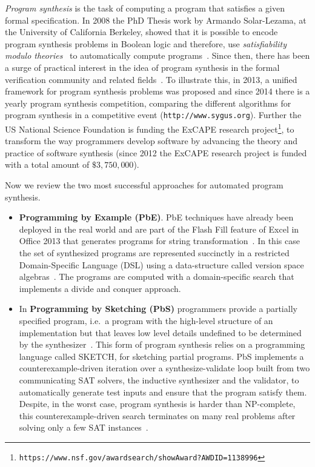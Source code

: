 \documentclass[10pt,a4paper]{paper}
\begin{document}
{\em Program synthesis} is the task of computing a program that satisfies a given formal specification. In 2008 the PhD Thesis work by Armando Solar-Lezama, at the University of California Berkeley, showed that it is possible to encode program synthesis problems in Boolean logic and therefore, use {\em satisfiability modulo theories}~\cite{barrett:SMT:2009} to automatically compute programs~\cite{lezama2008program}. Since then, there has been a surge of practical interest in the idea of program synthesis in the formal verification community and related fields~\cite{alur2013syntax}. To illustrate this, in 2013, a unified framework for program synthesis problems was proposed and since 2014 there is a yearly program synthesis competition, comparing the different algorithms for program synthesis in a competitive event ({\tt http://www.sygus.org}). Further the US National Science Foundation is funding the ExCAPE research project\footnote{\tt https://www.nsf.gov/awardsearch/showAward?AWD\textunderscore ID=1138996}, to transform the way programmers develop software by advancing the theory and practice of software synthesis (since 2012 the ExCAPE research project is funded with a total amount of $\$3,750,000$).

Now we review the two most successful approaches for automated program synthesis. 
\begin{itemize}
\item{\bf Programming by Example (PbE)}. PbE techniques have already been deployed in the real world and are part of the {\sc Flash Fill} feature of Excel in Office 2013 that generates programs for string transformation~\cite{gulwani2011automating}. In this case the set of synthesized programs are represented succinctly in a restricted Domain-Specific Language (DSL) using a data-structure called version space algebras~\cite{mitchell1982generalization}. The programs are computed with a domain-specific search that implements a divide and conquer approach. 

\item In {\bf Programming by Sketching (PbS)} programmers provide a partially specified program, i.e.~a program with the high-level structure of an implementation but that leaves low level details undefined to be determined by the synthesizer~\cite{solar2006combinatorial}. This form of program synthesis relies on a programming language called {\sc SKETCH}, for sketching partial programs. PbS implements a counterexample-driven iteration over a synthesize-validate loop built from two communicating SAT solvers, the inductive synthesizer and the validator, to automatically generate test inputs and ensure that the program satisfy them. Despite, in the worst case, program synthesis is harder than NP-complete, this counterexample-driven search terminates on many real problems after solving only a few SAT instances~\cite{lake2015human}.
\end{itemize}
\end{document}
